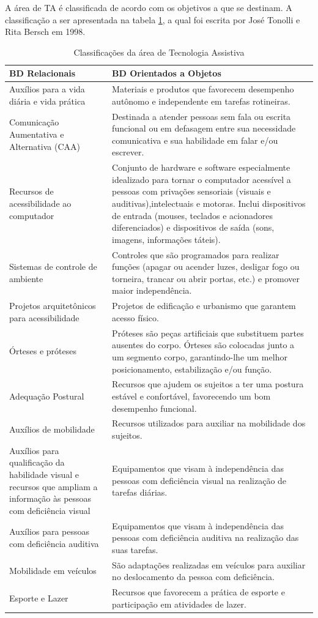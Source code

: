 \documentclass[
	12pt,			%
	openright,		%
	oneside,			%
	a4paper,			%
	chapter=TITLE,		%
	english,			%
	brazil,			%
	]{abntex2}
\begin{document}
A área de TA é classificada de acordo com os objetivos a que se destinam. A classificação a ser apresentada na tabela \ref{tab:tab-1}, a qual foi escrita por José Tonolli e Rita Bersch em 1998.

\begin{table}[H]
\caption{Classificações da área de Tecnologia Assistiva}
\label{tab:tab-1}
{
\centering
\footnotesize
\begin{tabular}{|p{7cm}|p{7cm}|}
\hline
\textbf{BD Relacionais} & \textbf{BD Orientados a Objetos} \\
\hline
Auxílios para a vida diária e vida prática & Materiais e produtos que favorecem desempenho autônomo e independente em tarefas rotineiras.\\
\hline
Comunicação Aumentativa e Alternativa (CAA) & Destinada a atender pessoas sem fala ou escrita funcional ou em defasagem entre sua necessidade comunicativa e sua habilidade em falar e/ou escrever.\\
\hline
Recursos de acessibilidade ao computador & Conjunto de hardware e software especialmente idealizado para tornar o computador acessível a pessoas com privações sensoriais (visuais e auditivas),intelectuais e motoras. Inclui dispositivos de entrada (mouses, teclados e acionadores diferenciados) e dispositivos de saída (sons, imagens, informações táteis).\\
\hline
Sistemas de controle de ambiente & Controles que são programados para realizar funções (apagar ou acender luzes, desligar fogo ou torneira, trancar ou abrir portas, etc.) e promover maior independência.\\
\hline
Projetos arquitetônicos para acessibilidade & Projetos de edificação e urbanismo que garantem acesso físico.\\
\hline
Órteses e próteses & Próteses são peças artificiais que substituem partes ausentes do corpo. Órteses são colocadas junto a um segmento corpo, garantindo-lhe um melhor posicionamento, estabilização e/ou função.\\
\hline
Adequação Postural & Recursos que ajudem os sujeitos a ter uma postura estável e confortável, favorecendo um bom desempenho funcional.\\
\hline
Auxílios de mobilidade & Recursos utilizados para auxiliar na mobilidade dos sujeitos.\\
\hline
Auxílios para qualificação da habilidade visual e recursos que ampliam a informação às pessoas com deficiência visual & Equipamentos que visam à independência das pessoas com deficiência visual na realização de tarefas diárias.\\
\hline
Auxílios para pessoas com deficiência auditiva & Equipamentos que visam à independência das pessoas com deficiência auditiva na realização das suas tarefas.\\
\hline
Mobilidade em veículos & São adaptações realizadas em veículos para auxiliar no deslocamento da pessoa com deficiência.\\
\hline
Esporte e Lazer & Recursos que favorecem a prática de esporte e participação em atividades de lazer.\\
\hline
\end{tabular}
}
\end{table}
\end{document}
